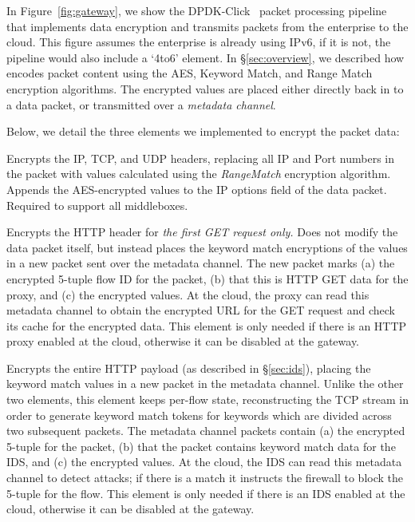  In Figure~\ref{fig:gateway}, we show the DPDK-Click~\cite{click} packet processing pipeline that implements data encryption and transmits packets from the enterprise to the cloud.
This figure assumes the enterprise is already using IPv6, if it is not, the pipeline would also include a `4to6' element.
In \S\ref{sec:overview}, we described how \sys encodes packet content using the AES, Keyword Match, and Range Match encryption algorithms. 
The encrypted values are placed either directly back in to a data packet, or transmitted over a {\it metadata channel}.

Below, we detail the three elements we implemented to encrypt the packet data:

 Encrypts the IP, TCP, and UDP headers, replacing all IP and Port numbers in the packet with values calculated using the {\it RangeMatch} encryption algorithm. Appends the AES-encrypted values to the IP options field of the data packet.
Required to support all middleboxes. 

 Encrypts the HTTP header for {\it the first GET request only.} Does not modify the data packet itself, but instead places the keyword match encryptions of the values in a new packet sent over the metadata channel. 
The new packet marks (a) the encrypted 5-tuple flow ID for the packet, (b) that this is HTTP GET data for the proxy, and (c) the encrypted values. At the cloud, the proxy can read this metadata channel to obtain the encrypted URL for the GET request and check its cache for the encrypted data. This element is only needed if there is an HTTP proxy enabled at the cloud, otherwise it can be disabled at the gateway.

 Encrypts the entire HTTP payload (as described in \S\ref{sec:ids}), placing the keyword match values in a new packet in the metadata channel. Unlike the other two elements, this element keeps per-flow state, reconstructing the TCP stream in order to generate keyword match tokens for keywords which are divided across two subsequent packets.  The metadata channel packets contain (a) the encrypted 5-tuple for the packet, (b) that the packet contains keyword match data for the IDS, and (c) the encrypted values. At the cloud, the IDS can read this metadata channel to detect attacks; if there is a match it instructs the firewall to block the 5-tuple for the flow. This element is only needed if there is an IDS enabled at the cloud, otherwise it can be disabled at the gateway.


